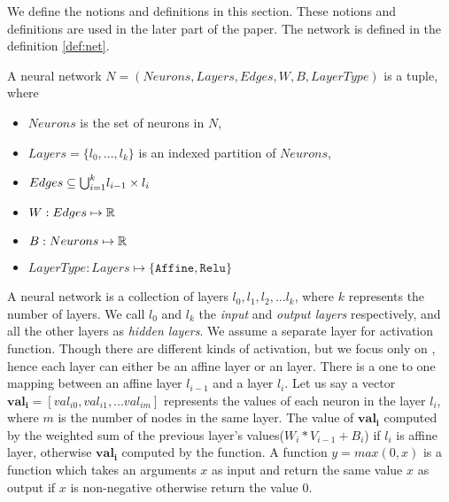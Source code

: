 We define the notions and definitions in this section. 
These notions and definitions are used in the later part of the paper. 
The network is defined in the definition \ref*{def:net}. 

\begin{df}
    \label{def:net}
    A neural network $N = (Neurons, Layers, Edges, W, B, LayerType)$ is a tuple, where
    \begin{itemize}
        \item $Neurons$ is the set of neurons in $N$,
        \item $Layers = \{l_0,...,l_k\}$ is an indexed partition of $Neurons$,
        \item $ Edges \subseteq {\bigcup}_{i=1}^{k} l_{i-1} \times l_{i}$
        \item $W : Edges \mapsto \mathbb{R}$
        \item $B : Neurons \mapsto \mathbb{R}$
        \item $LayerType : Layers \mapsto \{\mathtt{Affine}, \mathtt{Relu}\}$
    \end{itemize}
\end{df}

A neural network is a collection of layers $l_0, l_1, l_2, ... l_k$, where $k$ represents the number of layers.
We call $l_0$ and $l_k$ the {\em input} and {\em output layers} respectively, and all the other layers 
as {\em hidden layers}. We assume a separate layer for activation function. Though there are different kinds of
activation, but we focus only on \relu{}, hence each layer can either be an affine layer or an \relu{} layer.
There is a one to one mapping between an affine layer $l_{i-1}$ and a \relu{} layer $l_i$. 
Let us say a vector $\boldsymbol{val_i} = [val_{i0}, val_{i1}, ... val_{im}]$ represents the values of each neuron 
in the layer $l_i$, where $m$ is the number of nodes in the same layer.
The value of $\boldsymbol{val_i}$ computed by the weighted sum of the previous layer's values($W_i * V_{i-1} + B_i$)
if $l_i$ is affine layer, otherwise $\boldsymbol{val_i}$ computed by the \relu{} function. 
A function $y = max(0,x)$ is a \relu{} function which takes an arguments $x$ as input and return the
same value $x$ as output if $x$ is non-negative otherwise return the value 0. 

